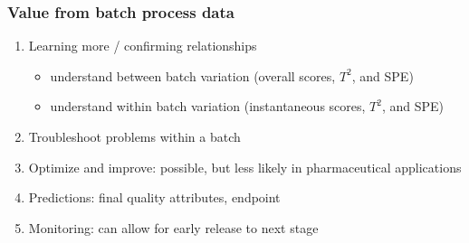 \begin{frame}\frametitle{Value from batch process data}
\begin{enumerate}
	\item 	Learning more / confirming relationships
		
			\begin{itemize}
				\item 	understand between batch variation (overall scores, \( T^2 \), and SPE)
				\item 	understand within batch variation (instantaneous scores, \( T^2 \), and SPE)
			\end{itemize}
			
	\item 	Troubleshoot problems within a batch
	\item 	Optimize and improve: possible, but less likely in pharmaceutical applications
	\item 	Predictions: final quality attributes, endpoint
	\item 	Monitoring: can allow for early release to next stage
	
\end{enumerate}
\end{frame}
